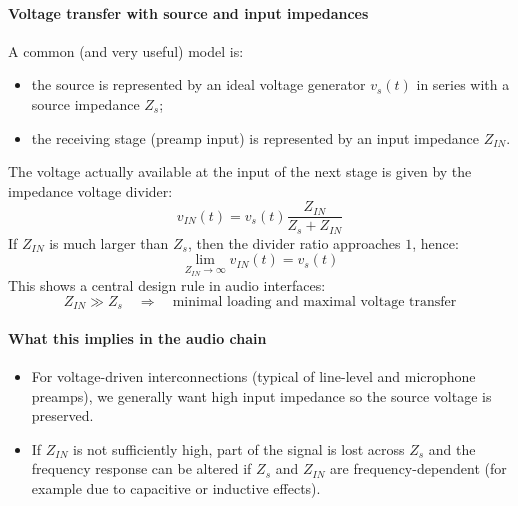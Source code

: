 \paragraph{Voltage transfer with source and input impedances} A common (and very useful) model is:

\begin{itemize}
    \item the source is represented by an ideal voltage generator \(v_s(t)\) in series with a source impedance \(Z_s\);
    \item the receiving stage (preamp input) is represented by an input impedance \(Z_{IN}\).
\end{itemize}

The voltage actually available at the input of the next stage is given by the impedance voltage divider:
\[
v_{IN}(t) = v_s(t)\frac{Z_{IN}}{Z_s + Z_{IN}}
\]
If \(Z_{IN}\) is much larger than \(Z_s\), then the divider ratio approaches \(1\), hence:
\[
\lim_{Z_{IN}\to\infty} v_{IN}(t) = v_s(t)
\]
This shows a central design rule in audio interfaces:
\[
Z_{IN} \gg Z_s \quad \Rightarrow \quad \text{minimal loading and maximal voltage transfer}
\]

\paragraph{What this implies in the audio chain}

\begin{itemize}
    \item For voltage-driven interconnections (typical of line-level and microphone preamps), we generally want high input impedance so the source voltage is preserved.
    \item If \(Z_{IN}\) is not sufficiently high, part of the signal is lost across \(Z_s\) and the frequency response can be altered if \(Z_s\) and \(Z_{IN}\) are frequency-dependent (for example due to capacitive or inductive effects).
\end{itemize}
